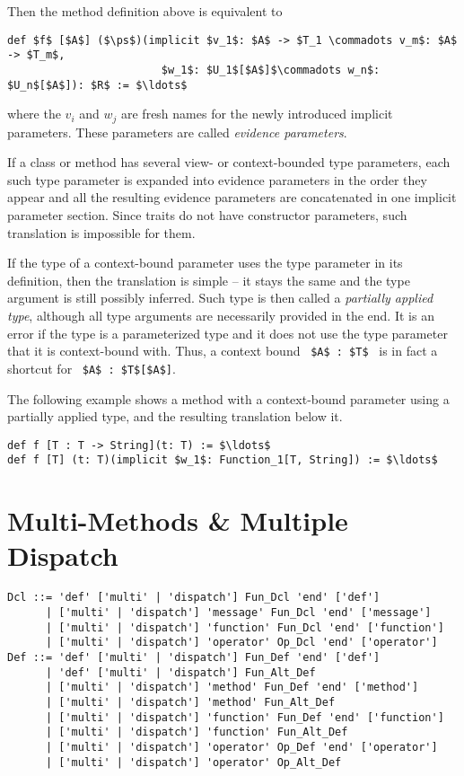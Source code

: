 Then the method definition above is equivalent to
\begin{lstlisting}
def $f$ [$A$] ($\ps$)(implicit $v_1$: $A$ -> $T_1 \commadots v_m$: $A$ -> $T_m$,
                        $w_1$: $U_1$[$A$]$\commadots w_n$: $U_n$[$A$]): $R$ := $\ldots$
\end{lstlisting}
where the $v_i$ and $w_j$ are fresh names for the newly introduced implicit parameters. These parameters are called {\em evidence parameters}. 

If a class or method has several view- or context-bounded type parameters, each such type parameter is expanded into evidence parameters in the order they appear and all the resulting evidence parameters are concatenated in one implicit parameter section. Since traits do not have constructor parameters, such translation is impossible for them. 

If the type of a context-bound parameter uses the type parameter in its definition, then the translation is simple -- it stays the same and the type argument is still possibly inferred. Such type is then called a {\em partially applied type}, although all type arguments are necessarily provided in the end. It is an error if the type is a parameterized type and it does not use the type parameter that it is context-bound with. Thus, a context bound ~\lstinline!$A$ : $T$!~ is in fact a shortcut for ~\lstinline!$A$ : $T$[$A$]!. 

\example The following example shows a method with a context-bound parameter using a partially applied type, and the resulting translation below it. 
\begin{lstlisting}
def f [T : T -> String](t: T) := $\ldots$
def f [T] (t: T)(implicit $w_1$: Function_1[T, String]) := $\ldots$
\end{lstlisting}





\section{Multi-Methods \& Multiple Dispatch}
\label{sec:multi-methods}

\syntax\begin{lstlisting}
Dcl ::= 'def' ['multi' | 'dispatch'] Fun_Dcl 'end' ['def']
      | ['multi' | 'dispatch'] 'message' Fun_Dcl 'end' ['message']
      | ['multi' | 'dispatch'] 'function' Fun_Dcl 'end' ['function']
      | ['multi' | 'dispatch'] 'operator' Op_Dcl 'end' ['operator']
Def ::= 'def' ['multi' | 'dispatch'] Fun_Def 'end' ['def']
      | 'def' ['multi' | 'dispatch'] Fun_Alt_Def
      | ['multi' | 'dispatch'] 'method' Fun_Def 'end' ['method']
      | ['multi' | 'dispatch'] 'method' Fun_Alt_Def
      | ['multi' | 'dispatch'] 'function' Fun_Def 'end' ['function']
      | ['multi' | 'dispatch'] 'function' Fun_Alt_Def
      | ['multi' | 'dispatch'] 'operator' Op_Def 'end' ['operator']
      | ['multi' | 'dispatch'] 'operator' Op_Alt_Def
\end{lstlisting}

